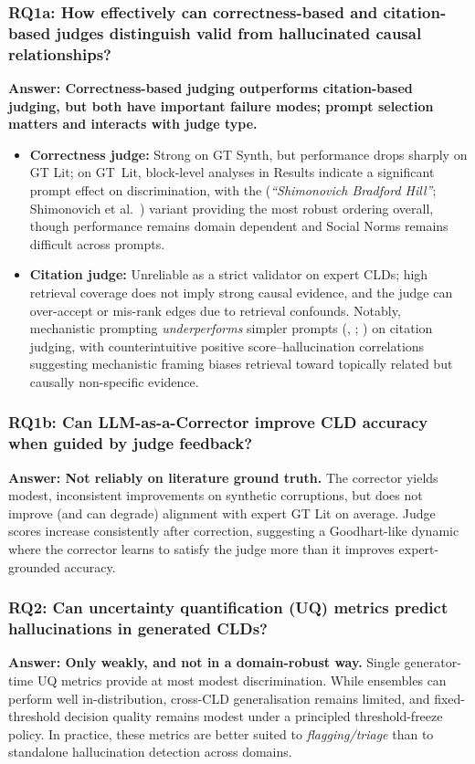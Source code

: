 \subsubsection*{RQ1a: How effectively can correctness-based and citation-based judges distinguish valid from hallucinated causal relationships?}
\textbf{Answer: Correctness-based judging outperforms citation-based judging, but both have important failure modes; prompt selection matters and interacts with judge type.}
\begin{itemize}[noitemsep]
    \item \textbf{Correctness judge:} Strong on GT Synth, but performance drops sharply on GT Lit; on GT~Lit, block-level analyses in Results indicate a significant prompt effect on discrimination, with the \PromptMechanistic{} (\emph{``Shimonovich Bradford Hill''}; Shimonovich et al.~\citep{shimonovich2020bradford}) variant providing the most robust ordering overall, though performance remains domain dependent and Social Norms remains difficult across prompts.
    \item \textbf{Citation judge:} Unreliable as a strict validator on expert CLDs; high retrieval coverage does not imply strong causal evidence, and the judge can over-accept or mis-rank edges due to retrieval confounds. Notably, mechanistic prompting \emph{underperforms} simpler prompts (\PromptBaseline{}, \PromptCoT{}; \citep{kojima2022large}) on citation judging, with counterintuitive positive score--hallucination correlations suggesting mechanistic framing biases retrieval toward topically related but causally non-specific evidence.
\end{itemize}

\subsubsection*{RQ1b: Can LLM-as-a-Corrector improve CLD accuracy when guided by judge feedback?}
\textbf{Answer: Not reliably on literature ground truth.} The corrector yields modest, inconsistent improvements on synthetic corruptions, but does not improve (and can degrade) alignment with expert GT Lit on average. Judge scores increase consistently after correction, suggesting a Goodhart-like dynamic where the corrector learns to satisfy the judge more than it improves expert-grounded accuracy.

\subsubsection*{RQ2: Can uncertainty quantification (UQ) metrics predict hallucinations in generated CLDs?}
\textbf{Answer: Only weakly, and not in a domain-robust way.} Single generator-time UQ metrics provide at most modest discrimination. While ensembles can perform well in-distribution, cross-CLD generalisation remains limited, and fixed-threshold decision quality remains modest under a principled threshold-freeze policy. In practice, these metrics are better suited to \textit{flagging/triage} than to standalone hallucination detection across domains.

